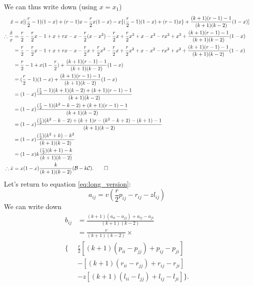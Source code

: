 \documentclass[13pt]{amsart}
\newcommand{\B}{\mathcal{B}}
\newcommand{\C}{\mathcal{C}}
\begin{document}
We can thus write down (using $x = x_1$)
\begin{equation}
    \begin{split}
        \dot{x} & = x [(\frac{r}{2} - 1) (1 - x) + (r-1)x - \frac{r}{2}x(1 - x) - x\{(\frac{r}{2} - 1)(1-x) + (r-1)x\} + \frac{(k+1)(r-1) - 1}{(k+1)(k-2)}(1-x)]
        \\
        \therefore \frac{\dot{x}}{x} & = \frac{r}{2} - \frac{r}{2}x - 1 + x + rx - x - \frac{r}{2}(x - x^2) - \frac{r}{2}x + \frac{r}{2}x^2 + x - x^2 - rx^2 + x^2 + \frac{(k+1)(r-1) - 1}{(k+1)(k-2)}(1-x)
        \\
        & = \frac{r}{2} - \frac{r}{2}x - 1 + x + rx - x - \frac{r}{2} x + \frac{r}{2}x^2 - \frac{r}{2}x + \frac{r}{2}x^2 + x - x^2 - rx^2 + x^2 + \frac{(k+1)(r-1) - 1}{(k+1)(k-2)}(1-x)
        \\
        & = \frac{r}{2}-1 + x(1-\frac{r}{2}) + \frac{(k+1)(r-1) - 1}{(k+1)(k-2)}(1-x)
        \\
        & = (\frac{r}{2}-1)(1-x) + \frac{(k+1)(r-1) - 1}{(k+1)(k-2)}(1-x)
        \\
        & = (1-x) \frac{(\frac{r}{2}-1)(k+1)(k-2) + (k+1)(r-1) - 1}{(k+1)(k-2)}
        \\
        & = (1-x) \frac{(\frac{r}{2}-1)(k^2 - k - 2) + (k+1)(r-1) - 1}{(k+1)(k-2)}
        \\
        & = (1-x) \frac{(\frac{r}{2})(k^2 - k - 2) + (k+1)r - (k^2 - k + 2) - (k+1) - 1}{(k+1)(k-2)}
        \\
        & = (1-x) \frac{(\frac{r}{2})(k^2 + k) - k^2}{(k+1)(k-2)}
        \\
        & = (1-x) k\frac{(\frac{r}{2})(k + 1) - k}{(k+1)(k-2)}
        \\
        \therefore \dot{x} & = x(1-x) \frac{k}{(k+1)(k-2)}(\B - k\C). \qed
    \end{split}
\end{equation}
Let's return to equation \ref{eq:long_version}:
\begin{equation}
    a_{ij} = v(\frac{r}{2} p_{ij} - r_{ij} - zl_{ij})
\end{equation}
We can write down
\begin{equation}
    \begin{split}
        b_{ij} & = \frac{(k+1)(a_{ii} - a_{jj}) + a_{ij} - a_{ji}}{(k+1)(k-2)}
        \\
        & = \frac{v}{(k+1)(k-2)} \times
        \\
        \Big\{ & \frac{r}{2} [(k+1)(p_{ii} - p_{jj}) + p_{ij} - p_{ji}]
        \\
        & - [(k+1)(r_{ii} - r_{jj}) + r_{ij} - r_{ji}]
        \\
        & - z[(k+1)(l_{ii} - l_{jj}) + l_{ij} - l_{ji}] \Big\}.
    \end{split}
    \label{eq:b_transform}
\end{equation}
\end{document}
